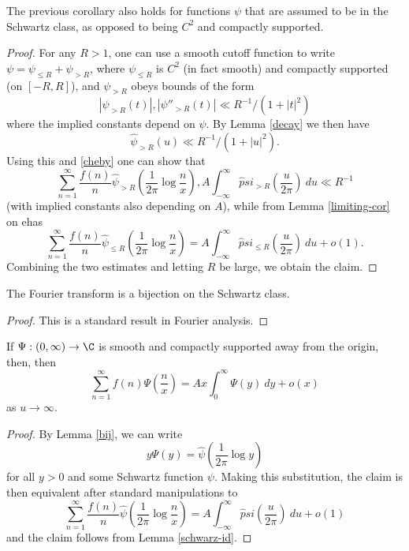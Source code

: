 \begin{lemma}\label{schwarz-id}  The previous corollary also holds for functions $\psi$ that are assumed to be in the Schwartz class, as opposed to being $C^2$ and compactly supported.
\end{lemma}

\begin{proof}
For any $R>1$, one can use a smooth cutoff function to write $\psi = \psi_{\leq R} + \psi_{>R}$, where $\psi_{\leq R}$ is $C^2$ (in fact smooth) and compactly supported (on $[-R,R]$), and $\psi_{>R}$ obeys bounds of the form
$$ |\psi_{>R}(t)|, |\psi''_{>R}(t)| \ll R^{-1} / (1 + |t|^2) $$
where the implied constants depend on $\psi$.  By Lemma \ref{decay} we then have
$$ \hat \psi_{>R}(u) \ll R^{-1} / (1+|u|^2).$$
Using this and \eqref{cheby} one can show that
$$ \sum_{n=1}^\infty \frac{f(n)}{n} \hat \psi_{>R}( \frac{1}{2\pi} \log \frac{n}{x} ), A \int_{-\infty}^\infty \hat psi_{>R} (\frac{u}{2\pi})\ du \ll R^{-1} $$
(with implied constants also depending on $A$), while from Lemma \ref{limiting-cor} on ehas
$$ \sum_{n=1}^\infty \frac{f(n)}{n} \hat \psi_{\leq R}( \frac{1}{2\pi} \log \frac{n}{x} ) = A \int_{-\infty}^\infty \hat psi_{\leq R} (\frac{u}{2\pi})\ du + o(1).$$
Combining the two estimates and letting $R$ be large, we obtain the claim.
\end{proof}

\begin{lemma}\label{bij}  The Fourier transform is a bijection on the Schwartz class.
\end{lemma}

\begin{proof}  This is a standard result in Fourier analysis.
\end{proof}

\begin{corollary}  If $\Psi: (0,\infty) \to \C$ is smooth and compactly supported away from the origin, then, then
$$ \sum_{n=1}^\infty f(n) \Psi( \frac{n}{x} ) = A x \int_0^\infty \Psi(y)\ dy + o(x)$$
as $u \to \infty$.
\end{corollary}

\begin{proof} By Lemma \ref{bij}, we can write
$$ y \Psi(y) = \hat \psi( \frac{1}{2\pi} \log y )$$
for all $y>0$ and some Schwartz function $\psi$.  Making this substitution, the claim is then equivalent after standard manipulations to
$$ \sum_{n=1}^\infty \frac{f(n)}{n} \hat \psi( \frac{1}{2\pi} \log \frac{n}{x} ) = A \int_{-\infty}^\infty \hat psi(\frac{u}{2\pi})\ du + o(1)$$
and the claim follows from Lemma \ref{schwarz-id}.
\end{proof}

